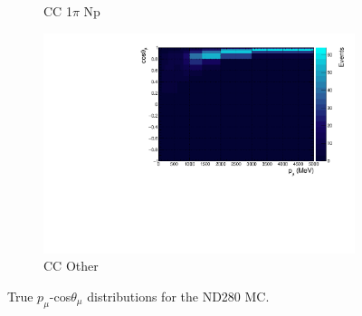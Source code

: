 \begin{figure}
\begin{subfigure}{.49\textwidth}
  \caption{CC 1$\pi$ Np}
\end{subfigure}
\begin{subfigure}{.49\textwidth}
  \centering
  \includegraphics[width=0.9\linewidth]{figs/nd280_pmtmuu_ccOther.pdf}
  \caption{CC Other}
\end{subfigure}
\caption{True $p_{\mu}$-cos$\theta_{\mu}$ distributions for the ND280 MC.}
\label{fig:nd280PmuTmu}
\end{figure}

